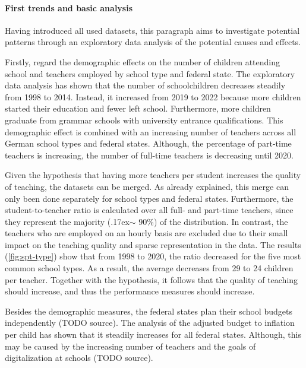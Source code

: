 
\paragraph{First trends and basic analysis}

Having introduced all used datasets, this paragraph aims to investigate potential patterns through an exploratory data analysis of the potential causes and effects. 

Firstly, regard the demographic effects on the number of children attending school and teachers employed by school type and federal state. The exploratory data analysis has shown that the number of schoolchildren decreases steadily from 1998 to 2014. Instead, it increased from 2019 to 2022 because more children started their education and fewer left school. Furthermore, more children graduate from grammar schools with university entrance qualifications. This demographic effect is combined with an increasing number of teachers across all German school types and federal states. Although, the percentage of part-time teachers is increasing, the number of full-time teachers is decreasing until 2020.

Given the hypothesis that having more teachers per student increases the quality of teaching, the datasets can be merged. As already explained, this merge can only been done separately for school types and federal states. Furthermore, the student-to-teacher ratio is calculated over all full- and part-time teachers, since they represent the majority ({\raise.17ex\hbox{$\scriptstyle\mathtt{\sim}$}} $90\%$) of the distribution. In contrast, the teachers who are employed on an hourly basis are excluded due to their small impact on the teaching quality and sparse representation in the data. The results (\autoref{fig:spt-type}) show that from 1998 to 2020, the ratio decreased for the five most common school types. As a result, the average decreases from 29 to 24 children per teacher. Together with the hypothesis, it follows that the quality of teaching should increase, and thus the performance measures should increase.

Besides the demographic measures, the federal states plan their school budgets independently (TODO source). The analysis of the adjusted budget to inflation per child has shown that it steadily increases for all federal states. Although, this may be caused by the increasing number of teachers and the goals of digitalization at schools (TODO source).

